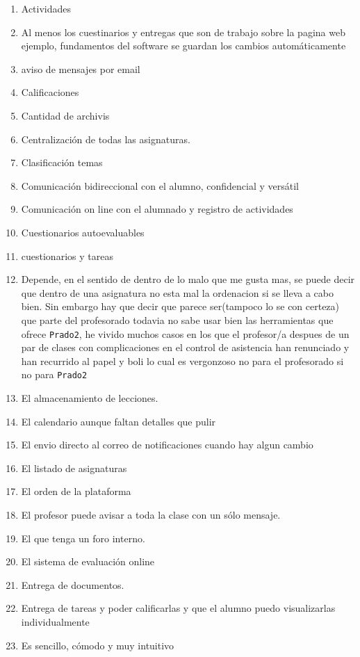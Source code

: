 \begin{enumerate}
\item Actividades
\item Al menos los cuestinarios y entregas que son de trabajo sobre la pagina web ejemplo, fundamentos del software se guardan los cambios automáticamente
\item aviso de mensajes por email
\item Calificaciones
\item Cantidad de archivis
\item Centralización de todas las asignaturas.
\item Clasificación temas
\item Comunicación bidireccional con el alumno, confidencial y versátil
\item Comunicación on line con el alumnado y registro de actividades
\item Cuestionarios autoevaluables
\item cuestionarios y tareas
\item Depende, en el sentido de dentro de lo malo que me gusta mas, se puede decir que dentro de una asignatura no esta mal la ordenacion si se lleva a cabo bien. Sin embargo hay que decir que parece ser(tampoco lo se con certeza) que parte del profesorado todavia no sabe usar bien las herramientas que ofrece \texttt{Prado2}, he vivido muchos casos en los que el profesor/a despues de un par de clases con complicaciones en el control de asistencia han renunciado y han recurrido al papel y boli lo cual es vergonzoso no para el profesorado si no para \texttt{Prado2}
\item El almacenamiento de lecciones.
\item El calendario aunque faltan detalles que pulir
\item El envio directo al correo de notificaciones cuando hay algun cambio
\item El listado de asignaturas
\item El orden de la plataforma
\item El profesor puede avisar a toda la clase con un sólo mensaje.
\item El que tenga un foro interno.
\item El sistema de evaluación online
\item Entrega de documentos.
\item Entrega de tareas y poder calificarlas y que el alumno puedo visualizarlas individualmente
\item Es sencillo, cómodo y muy intuitivo

\end{enumerate}
